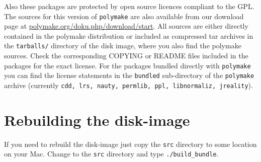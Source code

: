 \documentclass[a4paper]{amsart}
\newcommand{\polymake}{\texttt{polymake}\xspace}
\begin{document}
Also these packages are protected by open source licences compliant to the GPL. The sources for this version of \polymake are also available from our download page at \href{http://polymake.org/doku.php/download/start}{polymake.org/doku.php/download/start}. All sources are either directly contained in the polymake distribution or included as compressed tar archives in the \texttt{tarballs/} directory of the disk image, where you also find the polymake sources. Check the corresponding COPYING or README files included in the packages for the exact license.  For the packages bundled directly with \polymake you can find the license statements in the \texttt{bundled} sub-directory of the \polymake archive (currently \texttt{cdd, lrs, nauty, permlib, ppl, libnormaliz, jreality}).

\section*{Rebuilding the disk-image}

If you need to rebuild the disk-image just copy the \texttt{src} directory to some location on your Mac. Change to the \texttt{src} directory and type \texttt{./build\_bundle}.
\end{document}
